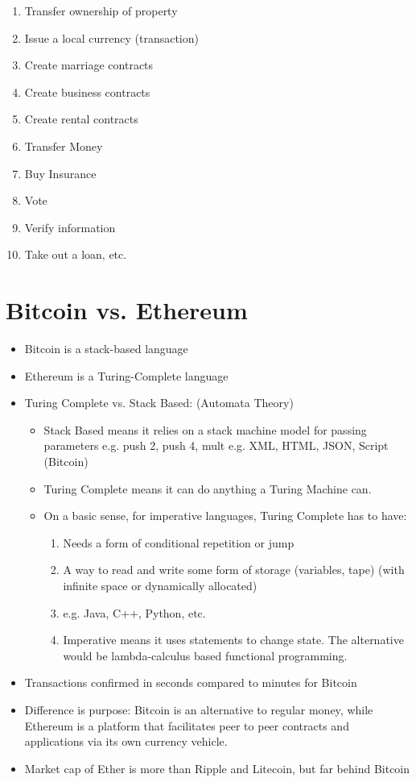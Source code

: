 \documentclass{article}
\begin{document}
\begin{itemize}
    \begin{enumerate}
      \item Transfer ownership of property
      \item Issue a local currency (transaction)
      \item Create marriage contracts
      \item Create business contracts
      \item Create rental contracts
      \item Transfer Money
      \item Buy Insurance
      \item Vote
      \item Verify information
      \item Take out a loan, etc.
    \end{enumerate}
\end{itemize}

\section*{Bitcoin vs. Ethereum}
\begin{itemize}
  \item Bitcoin is a stack-based language
  \item Ethereum is a Turing-Complete language
  \item Turing Complete vs. Stack Based: (Automata Theory)
    \begin{itemize}
      \item Stack Based means it relies on a stack machine model for passing parameters
        \subitem e.g. push 2, push 4, mult
        \subitem e.g. XML, HTML, JSON, Script (Bitcoin)
      \item Turing Complete means it can do anything a Turing Machine can.
      \item On a basic sense, for imperative languages, Turing Complete has to have:
        \begin{enumerate}
          \item Needs a form of conditional repetition or jump
          \item A way to read and write some form of storage (variables, tape) (with infinite space or dynamically allocated)
          \item e.g. Java, C++, Python, etc.
          \item Imperative means it uses statements to change state. The alternative would be lambda-calculus based functional programming.
        \end{enumerate}
    \end{itemize}
  \item Transactions confirmed in seconds compared to minutes for Bitcoin
  \item Difference is purpose:
    \subitem Bitcoin is an alternative to regular money, while Ethereum is a platform
    that facilitates peer to peer contracts and applications via its own currency vehicle.
  \item Market cap of Ether is more than Ripple and Litecoin, but far behind Bitcoin
\end{itemize}
\end{document}
